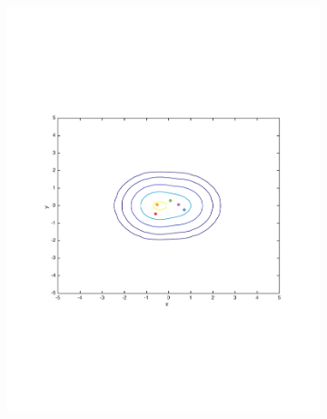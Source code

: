 \documentclass[preprint, 12pt]{elsarticle}
\begin{document}
\begin{figure}[htp!]
	\begin{subfigure}[t]{0.45\textwidth}
		\includegraphics[width=\textwidth, trim={15mm 75mm 20mm 75mm}]{Graphics/contour_mu05_nratio2.pdf}
		\caption[.]{}
		\label{fig:contour_mu05}
	\end{subfigure}
	~
	\begin{subfigure}[t]{0.45\textwidth}

\end{subfigure}
\end{figure}
\end{document}

